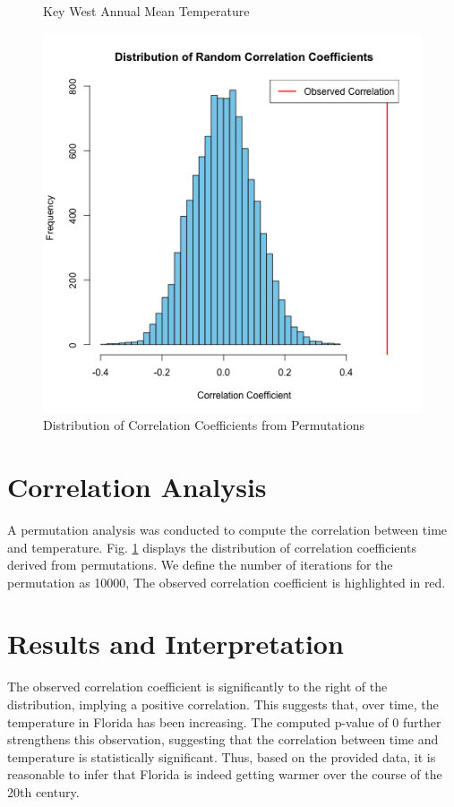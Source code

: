 \documentclass[a4paper,12pt,]{article}
\begin{document}
\begin{spacing}{1.0}
\begin{figure}[htbp]
\begin{minipage}[b]{0.45\linewidth}
    \caption{Key West Annual Mean Temperature}
    \label{fig:time}
  \end{minipage}
  \hfill
  \begin{minipage}[b]{0.45\linewidth}
    \includegraphics[width=\linewidth]{../results/01_corr.png}
    \caption{Distribution of Correlation Coefficients from Permutations}
    \label{fig:corr}
  \end{minipage}
\end{figure}
\section{Correlation Analysis}
A permutation analysis was conducted to compute the correlation between time and temperature. Fig. \ref{fig:corr} displays the distribution of correlation coefficients derived from permutations. We define the number of iterations for the permutation as 10000, The observed correlation coefficient is highlighted in red.
\section{Results and Interpretation}
The observed correlation coefficient is significantly to the right of the distribution, implying a positive correlation. This suggests that, over time, the temperature in Florida has been increasing. 
The computed p-value of 0 further strengthens this observation, suggesting that the correlation between time and temperature is statistically significant. Thus, based on the provided data, it is reasonable to infer that Florida is indeed getting warmer over the course of the 20th century.

\end{spacing}
\end{document}
